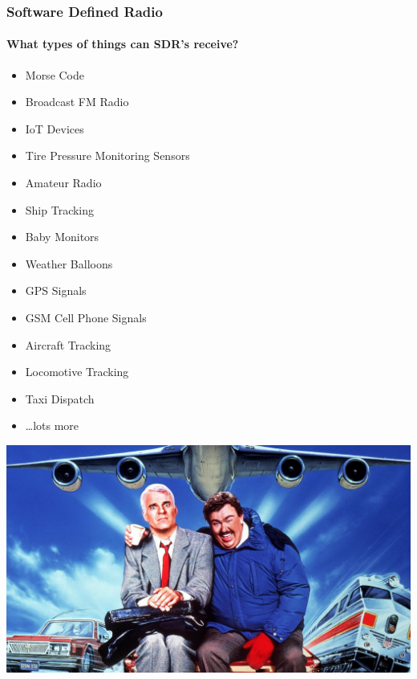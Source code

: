 \documentclass[aspectratio=169]{beamer}
\begin{document}
\begin{frame}[plain]
    \frametitle{Software Defined Radio}
    \framesubtitle{What types of things can SDR's receive?}
    \begin{itemize}
        \item Morse Code
        \item Broadcast FM Radio
        \item IoT Devices
        \item Tire Pressure Monitoring Sensors
        \item Amateur Radio
        \item Ship Tracking
        \item Baby Monitors
        \item Weather Balloons
        \item GPS Signals
        \item GSM Cell Phone Signals
        \item Aircraft Tracking
        \item Locomotive Tracking
        \item Taxi Dispatch
        \item \dots lots more
    \end{itemize}
\end{frame}
\begin{frame}[fragile]
  \begin{center}
  \includegraphics[width=0.75\paperwidth]{images/planes-trains.jpeg}
  \end{center}
\end{frame}
\end{document}
